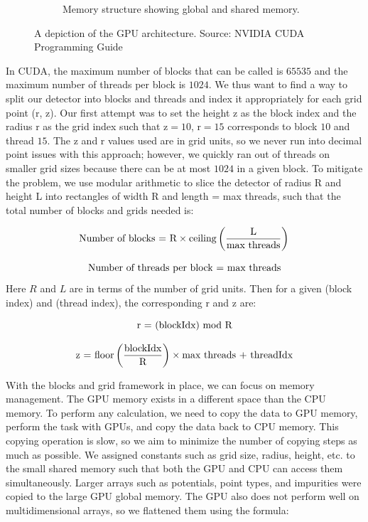 \begin{figure}
\begin{subfigure}{0.48\textwidth}
 \caption{Memory structure showing global and shared memory.} \label{fig:GPU_basics_b}
 \end{subfigure}
\caption{A depiction of the GPU architecture. Source: NVIDIA CUDA {\cpp}  Programming Guide} \label{fig:GPU_basics}
\end{figure}

In CUDA, the maximum number of blocks that can be called is $65535$ and the maximum number of threads per block is $1024$. We thus want to find a way to split our detector into blocks and threads and index it appropriately for each grid point (r, z). Our first attempt was to set the height z as the block index and the radius r as the grid index such that z$=10$, r$=15$ corresponds to block $10$ and thread $15$. The z and r values used are in grid units, so we never run into decimal point issues with this approach; however, we quickly ran out of threads on smaller grid sizes because there can be at most $1024$ in a given block. To mitigate the problem, we use modular arithmetic to slice the detector of radius R and height L into rectangles of width R and length = max threads, such that the total number of blocks and grids needed is:

\begin{equation}{\label{nu_b}}
 \text{Number of blocks = R}\times \text{ceiling} \left( \frac{\text{L}}{\text{max threads}} \right) \\
\end{equation}

\begin{equation}{\label{nu_g}}
 \text{Number of threads per block = max threads}
\end{equation}
Here $R$ and $L$ are in terms of the number of grid units. Then for a given (block index) and (thread index), the corresponding r and z are:

\begin{equation}{\label{r_eq}}
 \text{r = (blockIdx) mod R} \\
\end{equation}

\begin{equation}{\label{z_eq}}
 \text{z = floor}\left(\frac{\text{blockIdx}}{\text{R}}\right) \times \text{max threads + threadIdx}
\end{equation}

With the blocks and grid framework in place, we can focus on memory management. The GPU memory exists in a different space than the CPU memory. To perform any calculation, we need to copy the data to GPU memory, perform the task with GPUs, and copy the data back to CPU memory. This copying operation is slow, so we aim to minimize the number of copying steps as much as possible. We assigned constants such as grid size, radius, height, etc. to the small shared memory such that both the GPU and CPU can access them simultaneously. Larger arrays such as potentials, point types, and impurities were copied to the large GPU global memory. The GPU also does not perform well on multidimensional arrays, so we flattened them using the formula:

